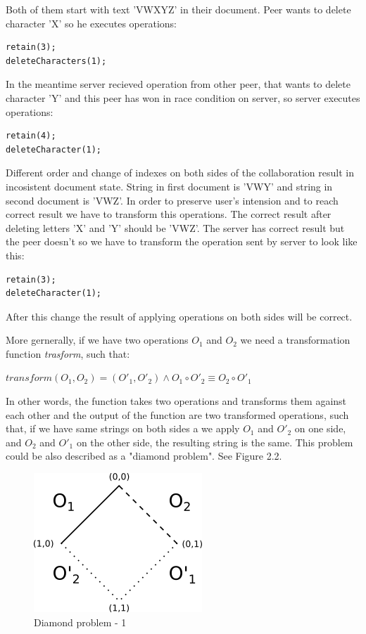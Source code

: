 \documentclass[12pt,oneside]{fithesis2}
\begin{document}
Both of them start with text 'VWXYZ' in their document. Peer wants to delete character 'X' so he executes operations:
\vspace{3mm}
\begin{verbatim}
retain(3);
deleteCharacters(1);
\end{verbatim} 
\vspace{3mm}
In the meantime server recieved operation from other peer, that wants to delete character 'Y' and this peer has won in race condition on server, so server executes operations:
\vspace{3mm} 
\begin{verbatim}
retain(4);
deleteCharacter(1);
\end{verbatim}
\vspace{3mm}
Different order and change of indexes on both sides of the collaboration result in incosistent document state. String in first document is 'VWY' and string in second document is 'VWZ'.  In order to preserve user's intension and to reach correct result we have to transform this operations. The correct result after deleting letters 'X' and 'Y' should be 'VWZ'. The server has correct result but the peer doesn't so we have to transform the operation sent by server to look like this:
\vspace{3mm}
\begin{verbatim}
retain(3);
deleteCharacter(1);
\end{verbatim}
\vspace{3mm}
After this change the result of applying operations on both sides will be correct.\par More gernerally, if we have two operations \(O_{1}\) and  \(O_{2}\) we need a transformation function \textit{trasform}, such that: 
\begin{center}
\(transform(O_{1},O_{2}) = (O'_{1},O'_{2}) \land O_{1} \circ O'_{2} \equiv O_{2} \circ O'_{1} \) 
\end{center}
In other words, the function takes two operations and transforms them against each other and the output of the function are two transformed operations, such that, if we have same strings on both sides a we apply \( O_{1} \) and \(O'_{2}\) on one side, and \( O_{2} \) and  \( O'_{1} \) on the other side, the resulting string is the same. This problem could be also described as a "diamond problem". See Figure 2.2.
\begin{figure}[H]
\caption{Diamond problem - 1}
\centering
\vspace{5mm}
\includegraphics{diamond}
\end{figure}
\end{document}
